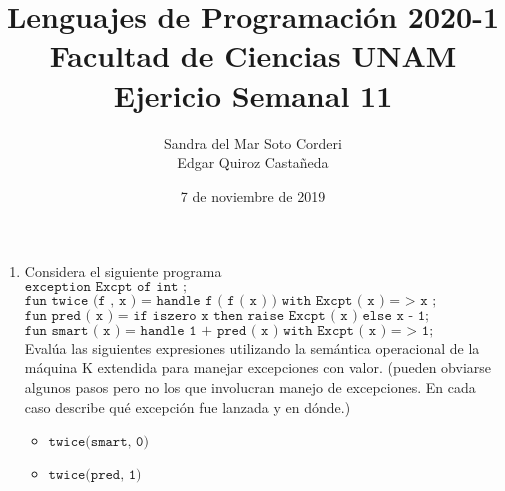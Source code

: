 \documentclass{article}
\title{
    Lenguajes de Programación 2020-1\\
    Facultad de Ciencias UNAM\\
    Ejericio Semanal 11
}
\author{
    Sandra del Mar Soto Corderi\\
    Edgar Quiroz Castañeda
}
\date{
    7 de noviembre de 2019
}
\begin{document}
    \maketitle
	\begin{enumerate}
		\item {
		Considera el siguiente programa\\
		$\texttt{exception Excpt of int ;}$\\
		$\texttt{fun twice (f , x ) = handle f ( f ( x ) ) with Excpt ( x ) = > x ;}$\\
		$\texttt{fun pred ( x ) = if iszero x then raise Excpt ( x ) else x - 1;}$\\
		$\texttt{fun smart ( x ) = handle 1 + pred ( x ) with Excpt ( x ) = > 1;}$\\
		
		Evalúa las siguientes expresiones utilizando la semántica operacional de la máquina K extendida para manejar excepciones con valor. (pueden obviarse algunos pasos pero no los que involucran manejo de excepciones. En cada caso describe qué excepción fue lanzada y en dónde.)\\
		\begin{itemize}
			\item {
			$\texttt{twice(smart, 0)}$
			}
			\item {
			$\texttt{twice(pred, 1)}$
			}
		\end{itemize}
		
		}
	\end{enumerate}
\end{document}
